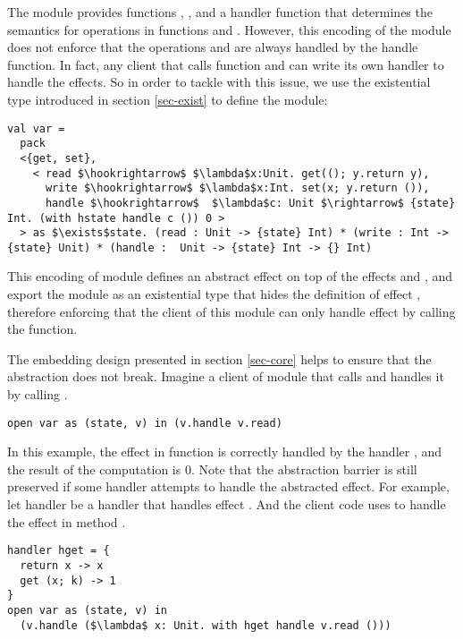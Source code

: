 The module provides functions , , and a handler function  that determines the semantics for operations in functions  and . However, this encoding of the module  does not enforce that the operations  and  are always handled by the handle function. In fact, any client that calls function  and  can write its own handler to handle the effects. So in order to tackle with this issue, we use the existential type introduced in section \ref{sec-exist} to define the module:
\begin{lstlisting}[mathescape=true]
val var = 
  pack 
  <{get, set}, 
    < read $\hookrightarrow$ $\lambda$x:Unit. get((); y.return y),
      write $\hookrightarrow$ $\lambda$x:Int. set(x; y.return ()),
      handle $\hookrightarrow$  $\lambda$c: Unit $\rightarrow$ {state} Int. (with hstate handle c ()) 0 >
  > as $\exists$state. (read : Unit -> {state} Int) * (write : Int -> {state} Unit) * (handle :  Unit -> {state} Int -> {} Int)
\end{lstlisting}
This encoding of module defines an abstract effect  on top of the effects  and , and export the module as an existential type that hides the definition of effect , therefore enforcing that the client of this module can only handle effect  by calling the  function. 

The embedding design presented in section \ref{sec-core} helps to ensure that the abstraction does not break. Imagine a client of module  that calls  and handles it by calling . 

\begin{lstlisting}[mathescape=true]
open var as (state, v) in (v.handle v.read)
\end{lstlisting}

In this example, the  effect in function  is correctly handled by the handler , and the result of the computation is 0. Note that the abstraction barrier is still preserved if some handler attempts to handle the abstracted effect. For example, let handler  be a handler that handles effect . And the client code uses  to handle the effect in method . 

\begin{lstlisting}[mathescape=true]
handler hget = {
  return x -> x
  get (x; k) -> 1
}
open var as (state, v) in 
  (v.handle ($\lambda$ x: Unit. with hget handle v.read ()))
\end{lstlisting}

